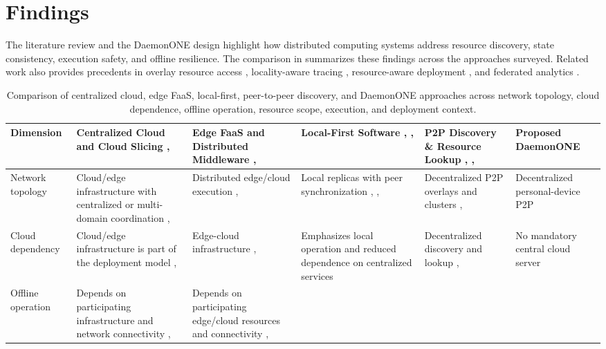 \documentclass[10pt,twocolumn]{article}
\begin{document}
\section{Findings}\label{sec:findings}
The literature review and the DaemonONE design highlight how distributed computing systems address resource discovery, state consistency, execution safety, and offline resilience. The comparison in  summarizes these findings across the approaches surveyed. Related work also provides precedents in overlay resource access \cite{ref1}, locality-aware tracing \cite{ref8}, resource-aware deployment \cite{ref13}, and federated analytics \cite{ref19}.
\begin{table}[!t]
	\centering
\caption{Comparison of centralized cloud, edge FaaS, local-first, peer-to-peer discovery, and DaemonONE approaches across network topology, cloud dependence, offline operation, resource scope, execution, and deployment context.}
	\label{tab:architecture-comparison}
	\small
	\begin{tabularx}{0.98\textwidth}{>{\raggedright\arraybackslash}p{}*{5}{>{\raggedright\arraybackslash}X}}
		\toprule
		\textbf{Dimension}
		& \textbf{Centralized Cloud and Cloud Slicing \cite{ref4}, \cite{ref21}}
		& \textbf{Edge FaaS and Distributed Middleware \cite{ref11}, \cite{ref25}}
		& \textbf{Local-First Software \cite{ref2}, \cite{ref3}, \cite{ref9}}
		& \textbf{P2P Discovery \& Resource Lookup \cite{ref16}, \cite{ref20}, \cite{ref22}}
		& \textbf{Proposed DaemonONE} \\
		\midrule
		Network topology
		& Cloud/edge infrastructure with centralized or multi-domain coordination \cite{ref4}, \cite{ref21}
		& Distributed edge/cloud execution \cite{ref11}, \cite{ref25}
		& Local replicas with peer synchronization \cite{ref2}, \cite{ref3}, \cite{ref9}
		& Decentralized P2P overlays and clusters \cite{ref16}, \cite{ref22}
		& Decentralized personal-device P2P \\
		\addlinespace
		Cloud dependency
		& Cloud/edge infrastructure is part of the deployment model \cite{ref4}, \cite{ref21}
		& Edge-cloud infrastructure \cite{ref11}, \cite{ref25}
		& Emphasizes local operation and reduced dependence on centralized services \cite{ref2}
		& Decentralized discovery and lookup \cite{ref16}, \cite{ref22}
		& No mandatory central cloud server \\
		\addlinespace
		Offline operation
		& Depends on participating infrastructure and network connectivity \cite{ref4}, \cite{ref21}
		& Depends on participating edge/cloud resources and connectivity \cite{ref11}, \cite{ref25}

\end{tabularx}
\end{table}
\end{document}

